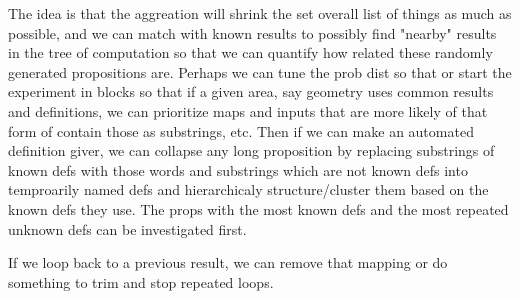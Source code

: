 \documentclass{book}
\begin{document}
	The idea is that the aggreation will shrink the set overall list of things as much as possible, and we can match with known results to possibly find "nearby" results in the tree of computation so that we can quantify how related these randomly generated propositions are. Perhaps we can tune the prob dist so that or start the experiment in blocks so that if a given area, say geometry uses common results and definitions, we can prioritize maps and inputs that are more likely of that form of contain those as substrings, etc. Then if we can make an automated definition giver, we can collapse any long proposition by replacing substrings of known defs with those words and substrings which are not known defs into temproarily named defs and hierarchicaly structure/cluster them based on the known defs they use. The props with the most known defs and the most repeated unknown defs can be investigated first.
	
	If we loop back to a previous result, we can remove that mapping or do something to trim and stop repeated loops.    
	
	
	
	
	
	
	
	
	
	
	
	
	
	
	
	
	
	
	
	
	
	
	
	
	
	
	
	
	
	
	
	
	
	
	
	
	
	
	
	
	
	
\end{document}
